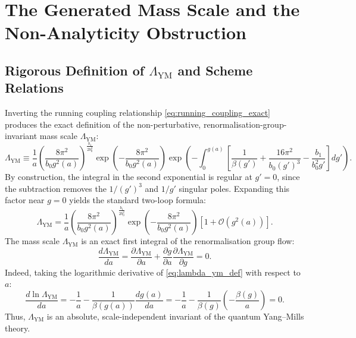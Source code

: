 \section{The Generated Mass Scale and the Non-Analyticity Obstruction}
\label{sec:non_analyticity}

\subsection{Rigorous Definition of $\Lambda_{\mathrm{YM}}$ and Scheme Relations}
\label{subsec:lambda_ym_definition}

Inverting the running coupling relationship \eqref{eq:running_coupling_exact} produces the exact definition of the non-perturbative, renormalisation-group-invariant mass scale $\Lambda_{\mathrm{YM}}$:
\begin{equation}
\label{eq:lambda_ym_def}
\Lambda_{\mathrm{YM}} \equiv \frac{1}{a} \left( \frac{8\pi^2}{b_0 g^2(a)} \right)^{\frac{b_1}{2 b_0^2}} \exp\left( -\frac{8\pi^2}{b_0 g^2(a)} \right) \exp\left( -\int_0^{g(a)} \left[ \frac{1}{\beta(g')} + \frac{16\pi^2}{b_0 (g')^3} - \frac{b_1}{b_0^2 g'} \right] dg' \right).
\end{equation}
By construction, the integral in the second exponential is regular at $g'=0$, since the subtraction removes the $1/(g')^3$ and $1/g'$ singular poles. Expanding this factor near $g=0$ yields the standard two-loop formula:
\begin{equation}
\label{eq:lambda_ym_twoloop}
\Lambda_{\mathrm{YM}} = \frac{1}{a} \left( \frac{8\pi^2}{b_0 g^2(a)} \right)^{\frac{b_1}{2 b_0^2}} \exp\left( -\frac{8\pi^2}{b_0 g^2(a)} \right) \left[ 1 + \mathcal{O}(g^2(a)) \right].
\end{equation}
The mass scale $\Lambda_{\mathrm{YM}}$ is an exact first integral of the renormalisation group flow:
\begin{equation}
\label{eq:rg_invariance_lambda}
\frac{d \Lambda_{\mathrm{YM}}}{da} = \frac{\partial \Lambda_{\mathrm{YM}}}{\partial a} + \frac{\partial g}{\partial a} \frac{\partial \Lambda_{\mathrm{YM}}}{\partial g} = 0.
\end{equation}
Indeed, taking the logarithmic derivative of \eqref{eq:lambda_ym_def} with respect to $a$:
\begin{equation}
\frac{d \ln \Lambda_{\mathrm{YM}}}{da} = -\frac{1}{a} - \frac{1}{\beta(g(a))} \frac{dg(a)}{da} = -\frac{1}{a} - \frac{1}{\beta(g)} \left( -\frac{\beta(g)}{a} \right) = 0.
\end{equation}
Thus, $\Lambda_{\mathrm{YM}}$ is an absolute, scale-independent invariant of the quantum Yang--Mills theory.


